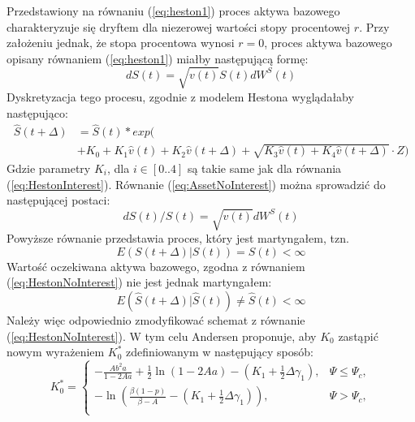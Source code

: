 \documentclass{pracamgr}
\begin{document}
Przedstawiony na równaniu (\ref{eq:heston1}) proces aktywa bazowego charakteryzuje się dryftem dla
niezerowej wartości stopy procentowej $r$.
Przy założeniu jednak, że stopa procentowa wynosi $r = 0$, proces aktywa 
bazowego opisany równaniem (\ref{eq:heston1}) miałby
następującą formę:
\begin{equation}
\label{eq:AssetNoInterest}
dS(t)  = \sqrt{v(t)} S(t) dW^S(t)
\end{equation}
Dyskretyzacja tego procesu, zgodnie z modelem Hestona wyglądałaby następująco:
\begin{equation}
\begin{aligned}
\label{eq:HestonNoInterest} 
\hat{S}(t + \Delta) &= \hat{S}(t) * exp(\\ 
                    &+ K_0 + K_1 \hat{v}(t) 
                    + K_2 \hat{v}(t+\Delta)
                    + \sqrt{K_3 \hat{v}(t) +  K_4 \hat{v}(t+\Delta)} \cdot Z)

\end{aligned}
\end{equation}
Gdzie parametry $K_i$, dla $i \in [0..4]$ są takie same jak dla równania (\ref{eq:HestonInterest}).
Równanie (\ref{eq:AssetNoInterest}) można sprowadzić do następującej postaci:
\begin{equation}
dS(t)/S(t) = \sqrt{v(t)}  dW^S(t)
\end{equation}
Powyższe równanie przedstawia proces, który jest martyngałem, tzn. 
\begin{equation}
E(S(t + \Delta)| S(t)) = S(t) < \infty
\end{equation}
Wartość oczekiwana aktywa bazowego, zgodna z równaniem (\ref{eq:HestonNoInterest})
nie jest jednak martyngałem:
\begin{equation}
  E(\hat{S}(t + \Delta)| \hat{S}(t)) \neq \hat{S}(t) < \infty
\end{equation}
Należy więc odpowiednio zmodyfikować schemat z równanie (\ref{eq:HestonNoInterest}). W tym celu
Andersen proponuje, aby $K_0$ zastąpić nowym wyrażeniem $K_0^*$ zdefiniowanym w następujący 
sposób:
\begin{equation}
\label{eq:psi}
K_0^* =
            \begin{cases}
               - \frac{Ab^2a}{1-2Aa} + \frac{1}{2} \ln (1 - 2Aa) - (K_1 + \frac{1}{2} \Delta \gamma_1), &  \Psi \leq \Psi_c,\\
               - \ln (\frac{\beta (1-p)}{\beta - A} - (K_1 + \frac{1}{2} \Delta \gamma_1)), & \Psi > \Psi_c,\\
            \end{cases} 
\end{equation} 
\end{document}
